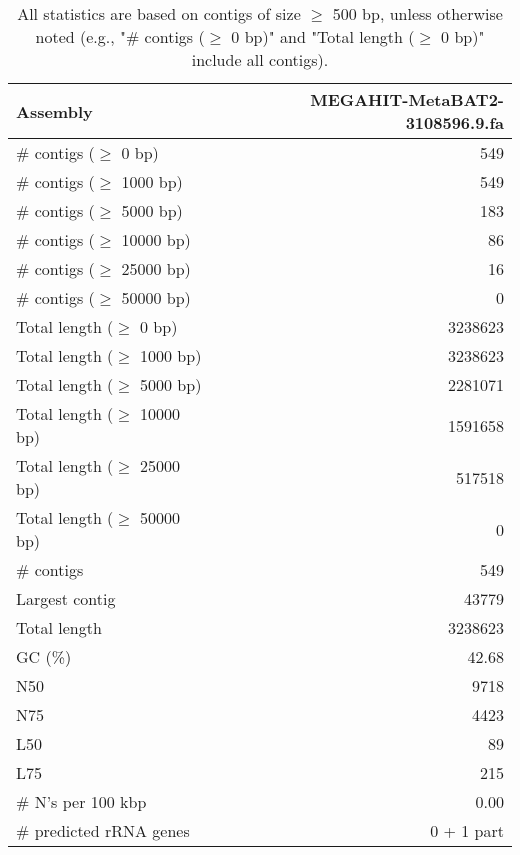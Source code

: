 \documentclass[12pt,a4paper]{article}
\begin{document}
\begin{table}[ht]
\begin{center}
\caption{All statistics are based on contigs of size $\geq$ 500 bp, unless otherwise noted (e.g., "\# contigs ($\geq$ 0 bp)" and "Total length ($\geq$ 0 bp)" include all contigs).}
\begin{tabular}{|l*{1}{|r}|}
\hline
Assembly & MEGAHIT-MetaBAT2-3108596.9.fa \\ \hline
\# contigs ($\geq$ 0 bp) & 549 \\ \hline
\# contigs ($\geq$ 1000 bp) & 549 \\ \hline
\# contigs ($\geq$ 5000 bp) & 183 \\ \hline
\# contigs ($\geq$ 10000 bp) & 86 \\ \hline
\# contigs ($\geq$ 25000 bp) & 16 \\ \hline
\# contigs ($\geq$ 50000 bp) & 0 \\ \hline
Total length ($\geq$ 0 bp) & 3238623 \\ \hline
Total length ($\geq$ 1000 bp) & 3238623 \\ \hline
Total length ($\geq$ 5000 bp) & 2281071 \\ \hline
Total length ($\geq$ 10000 bp) & 1591658 \\ \hline
Total length ($\geq$ 25000 bp) & 517518 \\ \hline
Total length ($\geq$ 50000 bp) & 0 \\ \hline
\# contigs & 549 \\ \hline
Largest contig & 43779 \\ \hline
Total length & 3238623 \\ \hline
GC (\%) & 42.68 \\ \hline
N50 & 9718 \\ \hline
N75 & 4423 \\ \hline
L50 & 89 \\ \hline
L75 & 215 \\ \hline
\# N's per 100 kbp & 0.00 \\ \hline
\# predicted rRNA genes & 0 + 1 part \\ \hline
\end{tabular}
\end{center}
\end{table}
\end{document}
